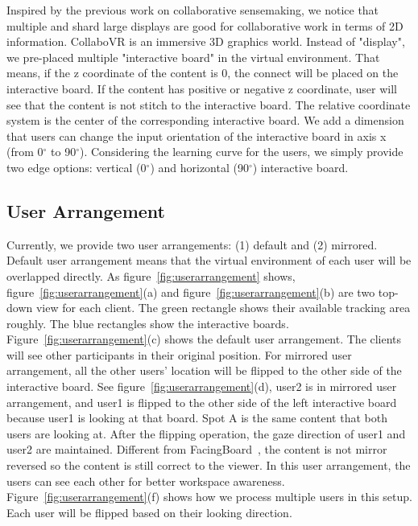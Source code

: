\documentclass{sigchi}
\begin{document}
Inspired by the previous work on collaborative sensemaking, we notice that multiple and shard large displays are good for collaborative work in terms of 2D information. CollaboVR is an immersive 3D graphics world. Instead of "display", we pre-placed multiple "interactive board" in the virtual environment. That means, if the z coordinate of the content is 0, the connect will be placed on the interactive board. If the content has positive or negative z coordinate, user will see that the content is not stitch to the interactive board. The relative coordinate system is the center of the corresponding interactive board. We add a dimension that users can change the input orientation of the interactive board in axis x (from 0$^{\circ}$ to 90$^{\circ}$). Considering the learning curve for the users, we simply provide two edge options: vertical (0$^{\circ}$) and horizontal (90$^{\circ}$) interactive board.

\subsection{User Arrangement}
Currently, we provide two user arrangements: (1) default and (2) mirrored. Default user arrangement means that the virtual environment of each user will be overlapped directly. As figure~\ref{fig:userarrangement} shows, figure~\ref{fig:userarrangement}(a) and figure~\ref{fig:userarrangement}(b) are two top-down view for each client. The green rectangle shows their available tracking area roughly. The blue rectangles show the interactive boards. Figure~\ref{fig:userarrangement}(c) shows the default user arrangement. The clients will see other participants in their original position. For mirrored user arrangement, all the other users' location will be flipped to the other side of the interactive board. See figure~\ref{fig:userarrangement}(d), user2 is in mirrored user arrangement, and user1 is flipped to the other side of the left interactive board because user1 is looking at that board. Spot A is the same content that both users are looking at. After the flipping operation, the gaze direction of user1 and user2 are maintained. Different from FacingBoard~\cite{li2014interactive}, the content is not mirror reversed so the content is still correct to the viewer. In this user arrangement, the users can see each other for better workspace awareness. Figure~\ref{fig:userarrangement}(f) shows how we process multiple users in this setup. Each user will be flipped based on their looking direction.
\end{document}
